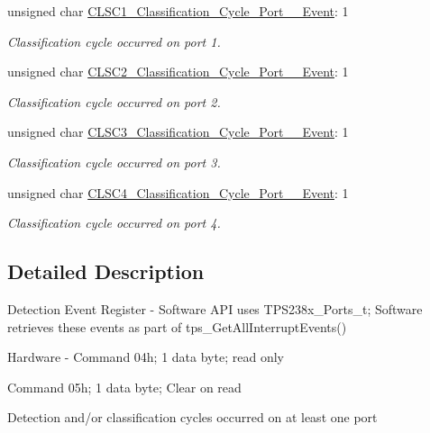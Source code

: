 \begin{DoxyCompactItemize}
unsigned char \hyperlink{struct_t_p_s238_x___detection___event___register__t_a2a502b29ff4533fccf5f2276141a6791}{C\-L\-S\-C1\-\_\-\-Classification\-\_\-\-Cycle\-\_\-\-Port\-\_\-\_\-\-Event}\-: 1
\begin{DoxyCompactList}\small\item\em Classification cycle occurred on port 1. \end{DoxyCompactList}\item 
unsigned char \hyperlink{struct_t_p_s238_x___detection___event___register__t_aa30d16f88685ec04c3b2732dd6087d3b}{C\-L\-S\-C2\-\_\-\-Classification\-\_\-\-Cycle\-\_\-\-Port\-\_\-\_\-\-Event}\-: 1
\begin{DoxyCompactList}\small\item\em Classification cycle occurred on port 2. \end{DoxyCompactList}\item 
unsigned char \hyperlink{struct_t_p_s238_x___detection___event___register__t_a336c681e10cf5d2703a4a5447e776808}{C\-L\-S\-C3\-\_\-\-Classification\-\_\-\-Cycle\-\_\-\-Port\-\_\-\_\-\-Event}\-: 1
\begin{DoxyCompactList}\small\item\em Classification cycle occurred on port 3. \end{DoxyCompactList}\item 
unsigned char \hyperlink{struct_t_p_s238_x___detection___event___register__t_a544064aea682e303b2ac89e604e4c069}{C\-L\-S\-C4\-\_\-\-Classification\-\_\-\-Cycle\-\_\-\-Port\-\_\-\_\-\-Event}\-: 1
\begin{DoxyCompactList}\small\item\em Classification cycle occurred on port 4. \end{DoxyCompactList}\end{DoxyCompactItemize}


\subsection{Detailed Description}
Detection Event Register -\/ Software A\-P\-I uses T\-P\-S238x\-\_\-\-Ports\-\_\-t; Software retrieves these events as part of tps\-\_\-\-Get\-All\-Interrupt\-Events() \par
 Hardware -\/ Command 04h; 1 data byte; read only \par

\begin{DoxyItemize}
\item Command 05h; 1 data byte; Clear on read \par
\par
 Detection and/or classification cycles occurred on at least one port 
\end{DoxyItemize}

